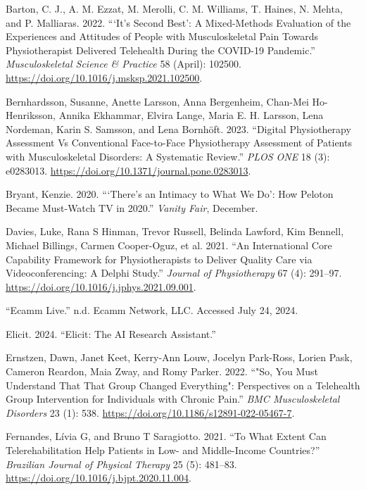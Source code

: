 \documentclass[
  letterpaper,
]{article}
\newlength{\cslhangindent}
\newenvironment{CSLReferences}[2] %
 {\begin{list}{}{%
  \setlength{\itemindent}{0pt}
  \setlength{\leftmargin}{0pt}
  \setlength{\parsep}{0pt}
  \ifodd #1
   \setlength{\leftmargin}{\cslhangindent}
   \setlength{\itemindent}{-1\cslhangindent}
  \fi
  \setlength{\itemsep}{#2\baselineskip}}}
 {\end{list}}
\begin{document}
\begin{CSLReferences}{1}{0}
Barton, C. J., A. M. Ezzat, M. Merolli, C. M. Williams, T. Haines, N.
Mehta, and P. Malliaras. 2022. {``{`{It}'s Second Best'}: {A}
Mixed-Methods Evaluation of the Experiences and Attitudes of People with
Musculoskeletal Pain Towards Physiotherapist Delivered Telehealth During
the {COVID-19} Pandemic.''} \emph{Musculoskeletal Science \& Practice}
58 (April): 102500. \url{https://doi.org/10.1016/j.msksp.2021.102500}.

Bernhardsson, Susanne, Anette Larsson, Anna Bergenheim, Chan-Mei
Ho-Henriksson, Annika Ekhammar, Elvira Lange, Maria E. H. Larsson, Lena
Nordeman, Karin S. Samsson, and Lena Bornhöft. 2023. {``Digital
Physiotherapy Assessment Vs Conventional Face-to-Face Physiotherapy
Assessment of Patients with Musculoskeletal Disorders: {A} Systematic
Review.''} \emph{PLOS ONE} 18 (3): e0283013.
\url{https://doi.org/10.1371/journal.pone.0283013}.

Bryant, Kenzie. 2020. {``{`{There}'s an {Intimacy} to {What We Do}'}:
{How Peloton Became Must-Watch TV} in 2020.''} \emph{Vanity Fair},
December.

Davies, Luke, Rana S Hinman, Trevor Russell, Belinda Lawford, Kim
Bennell, Michael Billings, Carmen Cooper-Oguz, et al. 2021. {``An
International Core Capability Framework for Physiotherapists to Deliver
Quality Care via Videoconferencing: A {Delphi} Study.''} \emph{Journal
of Physiotherapy} 67 (4): 291--97.
\url{https://doi.org/10.1016/j.jphys.2021.09.001}.

{``Ecamm {Live}.''} n.d. Ecamm Network, LLC. Accessed July 24, 2024.

Elicit. 2024. {``Elicit: {The AI Research Assistant}.''}

Ernstzen, Dawn, Janet Keet, Kerry-Ann Louw, Jocelyn Park-Ross, Lorien
Pask, Cameron Reardon, Maia Zway, and Romy Parker. 2022. {``"{So}, You
Must Understand That That Group Changed Everything": Perspectives on a
Telehealth Group Intervention for Individuals with Chronic Pain.''}
\emph{BMC Musculoskeletal Disorders} 23 (1): 538.
\url{https://doi.org/10.1186/s12891-022-05467-7}.

Fernandes, Lívia G, and Bruno T Saragiotto. 2021. {``To What Extent Can
Telerehabilitation Help Patients in Low- and Middle-Income Countries?''}
\emph{Brazilian Journal of Physical Therapy} 25 (5): 481--83.
\url{https://doi.org/10.1016/j.bjpt.2020.11.004}.


\end{CSLReferences}
\end{document}
